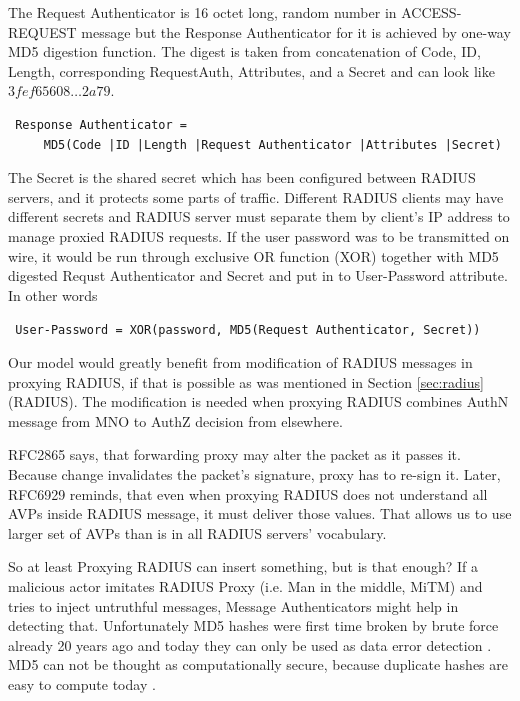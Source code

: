 \documentclass[12pt,a4paper,english]{tutthesis}
\begin{document}
The Request Authenticator is 16 octet long, random number in
ACCESS-REQUEST message but the Response Authenticator for it is achieved
by one-way MD5 digestion function. 
The digest is taken from concatenation of Code, ID, Length, corresponding
Request\-Auth, Attributes, and a Secret and can look like 
$3fef65608\ldots 2a79$. 
\begin{verbatim}
 Response Authenticator = 
     MD5(Code |ID |Length |Request Authenticator |Attributes |Secret)
\end{verbatim}
The Secret is the shared secret which has been configured between RADIUS servers,
and it protects some parts of traffic. 
Different RADIUS clients may have different
secrets and RADIUS server must separate them by client's IP address to
manage proxied RADIUS requests. \cite{radiusbook}
If the user password was to be transmitted on wire, it would be run
through exclusive OR function (XOR) together with MD5 digested Requst
Authenticator and Secret and put in to User-Password attribute.  In
other words
\begin{center}
{\tt 
User-Password = XOR(password, MD5(Request Authenticator, Secret))}
\end{center}





Our model would greatly benefit from modification of RADIUS messages in proxying
RADIUS, if that is possible as was mentioned in Section \ref{sec:radius}(RADIUS).
The modification is needed when proxying RADIUS combines AuthN message
from MNO to AuthZ decision from elsewhere.





RFC2865 \cite{rfc2865} says, that forwarding proxy may alter the packet
as it passes it.
Because change invalidates the packet's signature, proxy has to
re-sign it. Later, RFC6929 \cite{rfc6929} reminds, that even when
proxying RADIUS does not understand all AVPs inside RADIUS message, it
must deliver those values. That allows us to use larger set of AVPs 
than is in all RADIUS servers' vocabulary.


So at least Proxying RADIUS can insert something, but is that enough?
If a malicious actor imitates RADIUS Proxy (i.e. Man in the
middle, MiTM) and tries
to inject untruthful messages, Message Authenticators might help in detecting
that. Unfortunately MD5 hashes were first time broken by brute force
already 20 years ago and today they can only be used as data error
detection \cite[p.2]{rfc6151}. MD5 can not be thought as computationally secure,
because duplicate hashes are easy to compute today  \cite{xie2013fast}. 
\end{document}
